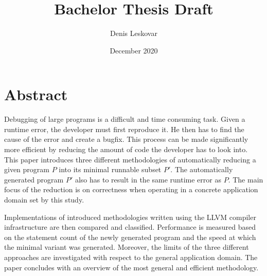 \documentclass{article}
\title{Bachelor Thesis Draft}
\author{Denis Leskovar}
\date{December 2020}
\begin{document}
\maketitle

\section{Abstract}
Debugging of large programs is a difficult and time consuming task. Given a runtime error, the
developer must first reproduce it. He then has to find the cause of the error and create a bugfix. This process can be made significantly more efficient by reducing the amount of code the developer has to look into. This paper introduces three different methodologies of automatically reducing a given program $P$ into its minimal runnable subset $P'$. The automatically generated program $P'$ also has to result in the same runtime error as $P$. The main focus of the reduction is on correctness when operating in a concrete application domain set by this study. \par
Implementations of introduced methodologies written using the LLVM compiler infrastructure are then compared and classified. Performance is measured based on the statement count of the newly generated program and the speed at which the minimal variant was generated. Moreover, the limits of the three different approaches are investigated with respect to the general application domain. The paper concludes with an overview of the most general and efficient methodology.
\end{document}
